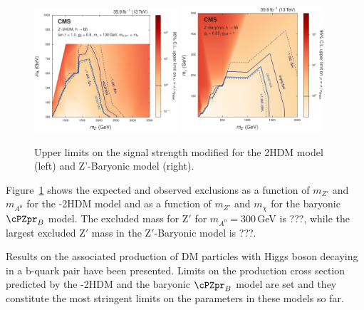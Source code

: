 \begin{figure}[htbp]
  \centering
  \includegraphics[width=0.475\textwidth]{figures/limits/limits_2hdm2d.png}
  \includegraphics[width=0.475\textwidth]{figures/limits/limits_barzp2d.png}
  \caption{Upper limits on the signal strength modified for the 2HDM model (left) and Z'-Baryonic model (right).}
  \label{fig:limits}
\end{figure}

Figure~\ref{fig:limits} shows the expected and observed exclusions as a function of $m_{Z'}$ and $m_{A^0}$ for the \cPZpr-2HDM model and as a function of $m_{Z'}$ and $m_{\chi}$ for the 
baryonic $\cPZpr_{B}$ model. The excluded mass for $\mathrm{Z}'$ for $m_{A^0}=300$\,GeV is ???, while the largest excluded $\mathrm{Z}'$ mass in the $\mathrm{Z}'$-Baryonic model is ???. %

Results on the associated production of DM particles with Higgs boson decaying in a b-quark pair have been presented. Limits on the production cross section predicted by the \cPZpr-2HDM and the baryonic $\cPZpr_{B}$ model are set and they constitute the most stringent limits on the parameters in these models so far. 
